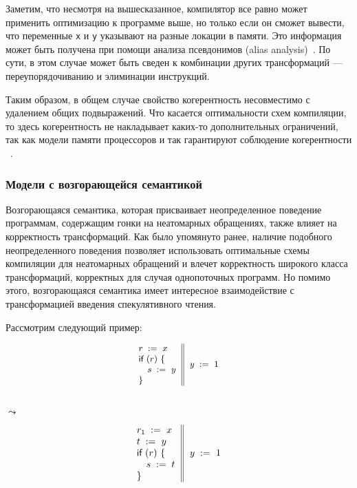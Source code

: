 Заметим, что несмотря на вышесказанное, компилятор 
все равно может применить оптимизацию \CSE к программе выше, 
но только если он сможет вывести, что переменные \texttt{x} и \texttt{y} 
указывают на разные локации в памяти. 
Это информация может быть получена при помощи 
анализа псевдонимов (alias analysis)~\cite{Diwan-al:PLDI1998}.
По сути, в этом случае \CSE может быть сведен к 
комбинации других трансформаций --- переупорядочиванию и элиминации инструкций. 

Таким образом, в общем случае свойство когерентность
несовместимо с удалением общих подвыражений. 
Что касается оптимальности схем компиляции, 
то здесь когерентность не накладывает каких-то 
дополнительных ограничений, 
так как модели памяти процессоров и так 
гарантируют соблюдение когерентности%
~\cite{Alglave-al:TOPLAS14, Sarkar-al:PLDI11, Sewell-al:CACM10, Lahav-al:PLDI17}. 

\subsubsection{Модели с возгорающейся семантикой}
\label{sec:analysis:ub}

Возгорающаяся семантика, которая присваивает 
неопределенное поведение программам, содержащим 
гонки на неатомарных обращениях, также влияет 
на корректность трансформаций. 
Как было упомянуто ранее, наличие подобного 
неопределенного поведения позволяет использовать
оптимальные схемы компиляции для неатомарных обращений
и влечет корректность широкого класса трансформаций, 
корректных для случая однопоточных программ. 
Но помимо этого, возгорающаяся семантика 
имеет интересное взаимодействие с трансформацией
введения спекулятивного чтения. 

Рассмотрим следующий пример:

\begin{minipage}{0.43\linewidth}
\begin{equation*}
\small
\inarrII{
  \readInst{}{r}{x}      \\
  \kw{if} {(r)} ~\{      \\
  \quad\readInst{}{s}{y} \\
  \}

}{
  \writeInst{}{y}{1}       \\
}
\label{ex:sliA}
\end{equation*}
\end{minipage}\hfill%
\begin{minipage}{0.09\linewidth}
\Large~\\ $\leadsto$
\end{minipage}\hfill%
\begin{minipage}{0.43\linewidth}
\begin{equation*}
\inarrII{
  \readInst{}{r_1}{x}      \\
  \readInst{}{t}{y}        \\
  \kw{if} {(r)} ~\{        \\
  \quad\assignInst{s}{t}   \\
  \}

}{
  \writeInst{}{y}{1}       \\
}
\label{ex:sliB}
\end{equation*}
\end{minipage}
 
